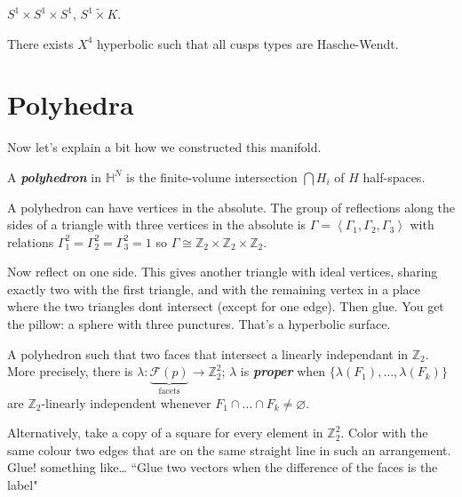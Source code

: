 \begin{thm}\leavevmode
$S^1 \times S^1\times S^1$, $S^1\tilde{\times}K$.
\end{thm}

\begin{thm}\leavevmode
There exists $X^4$ hyperbolic such that all cusps types are Hasche-Wendt.
\end{thm}

\section{Polyhedra}

Now let's explain a bit how we constructed this manifold.

\begin{defn}\leavevmode
	A  \textit{\textbf{polyhedron}} in $\mathbb{H}^N$ is the finite-volume intersection $\bigcap H_i $ of $H$ half-spaces.
\end{defn}

\begin{example}\leavevmode
A polyhedron can have vertices in the absolute. The group of reflections along the sides of a triangle with three vertices in the absolute is $\Gamma=\left<\Gamma_1,\Gamma_2,\Gamma_3\right>$ with relations $\Gamma_1^2=\Gamma_2^2=\Gamma_3^2=1$ so $\Gamma\cong\mathbb{Z}_2\times\mathbb{Z}_2\times\mathbb{Z}_2$.

Now reflect on one side. This gives another triangle with ideal vertices, sharing exactly two with the first triangle, and with the remaining vertex in a place where the two triangles dont intersect (except for one edge). Then glue. You get the pillow: a sphere with three punctures. That's a hyperbolic surface.
\end{example}

	A polyhedron such that two faces that intersect a linearly independant in $\mathbb{Z}_2$. More precisely, there is $\lambda:\underbrace{\mathcal{F}(p)}_{\text{facets}}\to \mathbb{Z}_2^2$; $\lambda$ is \textit{\textbf{proper}} when $\{\lambda(F_1),\ldots,\lambda(F_k)\}$ are $\mathbb{Z}_2$-linearly independent whenever $F_1 \cap\ldots\cap F_k\neq  \varnothing$.

	Alternatively, take a copy of a square for every element in $\mathbb{Z}_2^2$. Color with the same colour two edges that are on the same straight line in such an arrangement. Glue! something like… “Glue two vectors when the difference of the faces is the label"

